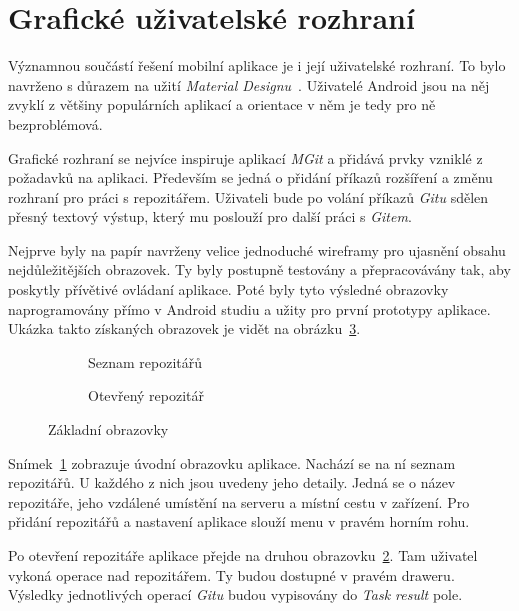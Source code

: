 \newpage
\section{Grafické uživatelské rozhraní}
Významnou součástí řešení mobilní aplikace je i její uživatelské rozhraní. To bylo navrženo s důrazem na užití \emph{Material Designu}~. Uživatelé Android jsou na něj zvyklí z většiny populárních aplikací a orientace v něm je tedy pro ně bezproblémová.

Grafické rozhraní se nejvíce inspiruje aplikací \emph{MGit} a přidává prvky vzniklé z požadavků na aplikaci. Především se jedná o přidání příkazů rozšíření a změnu rozhraní pro práci s repozitářem. Uživateli bude po volání příkazů \emph{Gitu} sdělen přesný textový výstup, který mu poslouží pro další práci s \emph{Gitem}. 

Nejprve byly na papír navrženy velice jednoduché wireframy pro ujasnění obsahu nejdůležitějších obrazovek. Ty byly postupně testovány a přepracovávány tak, aby poskytly přívětivé ovládaní aplikace. Poté byly tyto výsledné obrazovky naprogramovány přímo v Android studiu a užity pro první prototypy aplikace. Ukázka takto získaných obrazovek je vidět na obrázku~\ref{fig:obrazovky}.

\begin{figure}[ht]
    \vspace{0.5cm}
    \centering
    \begin{subfigure}{.4\textwidth}        
        \centering
        \caption{Seznam repozitářů}\label{fig:orig}
        \label{fig:repolist_frame}
    \end{subfigure}
    \begin{subfigure}{.4\textwidth}
        \centering
        \caption{Otevřený repozitář}
        \label{fig:result_frame}
    \end{subfigure}
\caption{Základní obrazovky}%
\label{fig:obrazovky}%
\end{figure}

Snímek~\ref{fig:repolist_frame} zobrazuje úvodní obrazovku aplikace. Nachází se na ní seznam repozitářů. U každého z nich jsou uvedeny jeho detaily. Jedná se o název repozitáře, jeho vzdálené umístění na serveru a místní cestu v zařízení. Pro přidání repozitářů a nastavení aplikace slouží menu v pravém horním rohu. 

Po otevření repozitáře aplikace přejde na druhou obrazovku~\ref{fig:result_frame}. Tam uživatel vykoná operace nad repozitářem. Ty budou dostupné v pravém draweru. Výsledky jednotlivých operací \emph{Gitu} budou vypisovány do \emph{Task result} pole.

